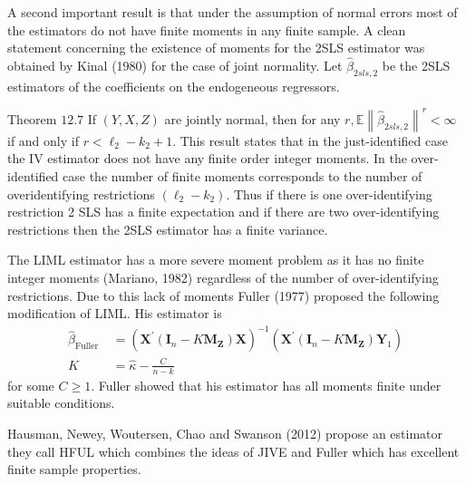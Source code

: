 \documentclass[10pt]{article}
\begin{document}
A second important result is that under the assumption of normal errors most of the estimators do not have finite moments in any finite sample. A clean statement concerning the existence of moments for the 2SLS estimator was obtained by Kinal (1980) for the case of joint normality. Let $\widehat{\beta}_{2 s l s, 2}$ be the 2SLS estimators of the coefficients on the endogeneous regressors.

Theorem $12.7$ If $(Y, X, Z)$ are jointly normal, then for any $r, \mathbb{E}\left\|\widehat{\beta}_{2 s l s, 2}\right\|^{r}<\infty$ if and only if $r<\ell_{2}-k_{2}+1$. This result states that in the just-identified case the IV estimator does not have any finite order integer moments. In the over-identified case the number of finite moments corresponds to the number of overidentifying restrictions $\left(\ell_{2}-k_{2}\right)$. Thus if there is one over-identifying restriction 2 SLS has a finite expectation and if there are two over-identifying restrictions then the 2SLS estimator has a finite variance.

The LIML estimator has a more severe moment problem as it has no finite integer moments (Mariano, 1982) regardless of the number of over-identifying restrictions. Due to this lack of moments Fuller (1977) proposed the following modification of LIML. His estimator is
$$
\begin{aligned}
\widehat{\beta}_{\text {Fuller }} &=\left(\boldsymbol{X}^{\prime}\left(\boldsymbol{I}_{n}-K \boldsymbol{M}_{\boldsymbol{Z}}\right) \boldsymbol{X}\right)^{-1}\left(\boldsymbol{X}^{\prime}\left(\boldsymbol{I}_{n}-K \boldsymbol{M}_{\boldsymbol{Z}}\right) \boldsymbol{Y}_{1}\right) \\
K &=\widehat{\kappa}-\frac{C}{n-k}
\end{aligned}
$$
for some $C \geq 1$. Fuller showed that his estimator has all moments finite under suitable conditions.

Hausman, Newey, Woutersen, Chao and Swanson (2012) propose an estimator they call HFUL which combines the ideas of JIVE and Fuller which has excellent finite sample properties.
\end{document}
